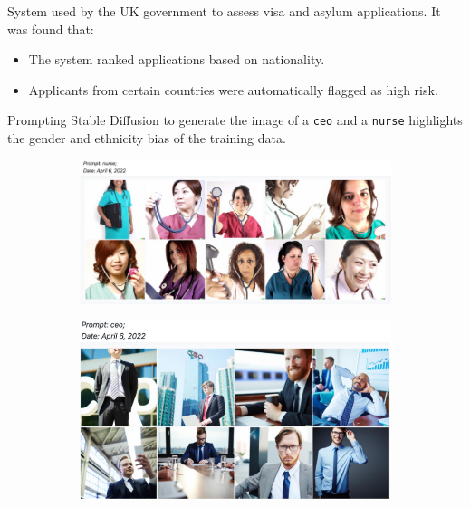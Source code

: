 \begin{example}
    System used by the UK government to assess visa and asylum applications. It was found that:
    \begin{itemize}
        \item The system ranked applications based on nationality.
        \item Applicants from certain countries were automatically flagged as high risk.
    \end{itemize}
\end{example}

\begin{example}[Generative AI]
    Prompting Stable Diffusion to generate the image of a \texttt{ceo} and a \texttt{nurse} highlights the gender and ethnicity bias of the training data.

    \begin{figure}[H]
        \centering
        \begin{subfigure}{0.5\linewidth}
            \centering
            \includegraphics[width=\linewidth]{./img/stable_diffusion_nurse.png}
        \end{subfigure}
        \hfill
        \begin{subfigure}{0.4\linewidth}
            \centering
            \includegraphics[width=\linewidth]{./img/stable_diffusion_ceo.png}
        \end{subfigure}
    \end{figure}


\end{example}
